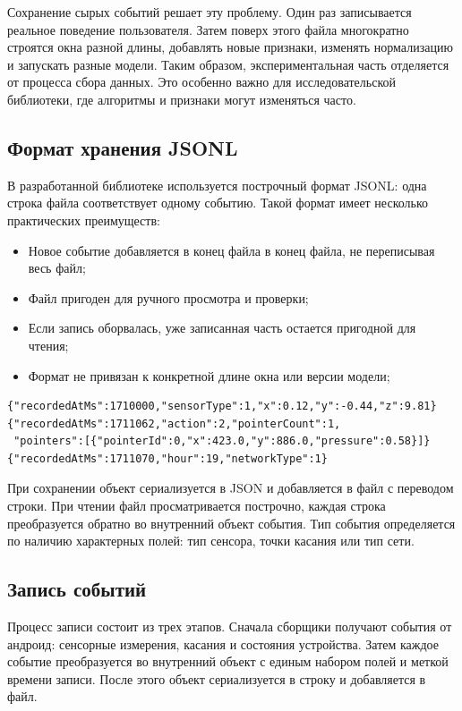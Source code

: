 \documentclass[oneside,senior,etd]{BYUPhys}
\begin{document}
Сохранение сырых событий решает эту проблему. Один раз записывается реальное поведение пользователя. Затем поверх этого файла многократно строятся окна разной длины, добавлять новые признаки, изменять нормализацию и запускать разные модели. Таким образом, экспериментальная часть отделяется от процесса сбора данных. Это особенно важно для исследовательской библиотеки, где алгоритмы и признаки могут изменяться часто.

\subsection{Формат хранения JSONL}

В разработанной библиотеке используется построчный формат JSONL: одна строка файла соответствует одному событию. Такой формат имеет несколько практических преимуществ:
\begin{itemize}
	\item Новое событие добавляется в конец файла в конец файла, не переписывая весь файл;
	\item Файл пригоден для ручного просмотра и проверки;
	\item Если запись оборвалась, уже записанная часть остается пригодной для чтения;
	\item Формат не привязан к конкретной длине окна или версии модели;
\end{itemize}

\begin{lstlisting}[caption={Пример построчного хранения событий JSONL},label={lst:jsonl}]
{"recordedAtMs":1710000,"sensorType":1,"x":0.12,"y":-0.44,"z":9.81}
{"recordedAtMs":1711062,"action":2,"pointerCount":1,
 "pointers":[{"pointerId":0,"x":423.0,"y":886.0,"pressure":0.58}]}
{"recordedAtMs":1711070,"hour":19,"networkType":1}
\end{lstlisting}

При сохранении объект сериализуется в JSON и добавляется в файл с переводом строки. При чтении файл просматривается построчно, каждая строка преобразуется обратно во внутренний объект события. Тип события определяется по наличию характерных полей: тип сенсора, точки касания или тип сети.

\subsection{Запись событий}

Процесс записи состоит из трех этапов. Сначала сборщики получают события от андроид: сенсорные измерения, касания и состояния устройства. Затем каждое событие преобразуется во внутренний объект с единым набором полей и меткой времени записи. После этого объект сериализуется в строку и добавляется в файл.
\end{document}
